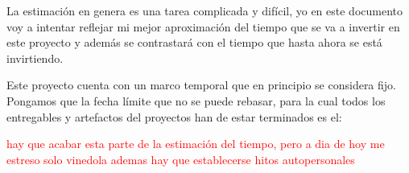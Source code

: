 La estimación en genera es una tarea complicada y difícil, yo en este documento voy a intentar reflejar mi mejor aproximación del tiempo que se va a invertir en este proyecto y además se contrastará con el tiempo que hasta ahora se está invirtiendo. 

Este proyecto cuenta con un marco temporal que en principio se considera fijo. Pongamos que la fecha límite que no se puede rebasar, para la cual todos los entregables y artefactos del proyectos han de estar terminados es el:

\textcolor{red}{hay que acabar esta parte de la estimación del tiempo, pero a dia de hoy me estreso solo vinedola ademas hay que establecerse hitos autopersonales}